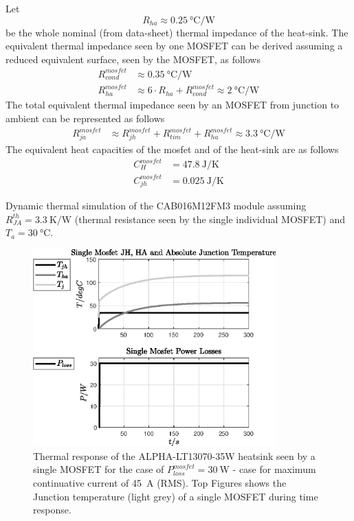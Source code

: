 \documentclass[11pt,a4paper,oneside]{book}
\numberwithin{equation}{section}
\theoremstyle{it}
\theoremstyle{definition}
\begin{document}
Let 
\begin{equation}
	R_{ha}\approx\SI{0.25}{\celsius\per\watt}
\end{equation}
be the whole nominal (from data-sheet) thermal impedance of the heat-sink. The equivalent thermal impedance seen by one MOSFET can be derived assuming a reduced  equivalent surface, seen by the MOSFET, as follows
\begin{equation}
	\begin{aligned}
		R_{cond}^{mosfet} &\approx\SI{0.35}{\celsius\per\watt} \\[6pt]
		R_{ha}^{mosfet} &\approx 6\cdot R_{ha} + R_{cond}^{mosfet} \approx \SI{2}{\celsius\per\watt}
	\end{aligned}
\end{equation}
The total equivalent thermal impedance seen by an MOSFET from junction to ambient can be represented as follows
\begin{equation}
	\begin{aligned}
	R_{ja}^{mosfet} &\approx R_{jh}^{mosfet} + R_{tim}^{mosfet}+R_{ha}^{mosfet} \approx\SI{3.3}{\celsius\per\watt}
	\end{aligned}
\end{equation}
The equivalent heat capacities of the mosfet and of the heat-sink are as follows
\begin{equation}
	\begin{aligned}
		C_H^{mosfet} &=\SI{47.8}{\joule\per\kelvin} \\[6pt]
		C_{jh}^{mosfet} &=\SI{0.025}{\joule\per\kelvin}
	\end{aligned}
\end{equation}

Dynamic thermal simulation of the CAB016M12FM3 module assuming $R_{JA}^{th}=\SI{3.3}{\kelvin\per\watt}$ (thermal resistance seen by the single individual MOSFET) and $T_a=\SI{30}{\celsius}$.
\begin{figure}[H]
	\centering
	\includegraphics[width = 265pt, angle = 0, 
	keepaspectratio]{figures/thermal_analysis/sim_results_thermal_fig_1.eps}
	\captionsetup{width=0.75\textwidth, font=small}	
	\caption{Thermal response of the ALPHA-LT13070-35W heatsink seen by a single MOSFET for the case of $P_{loss}^{mosfet}=\SI{30}{\watt}$ - case for maximum continuative current of \SI{45}{\ampere} (RMS). Top Figures shows the Junction temperature (light grey) of a single MOSFET during time response.}
\end{figure}
\end{document}
